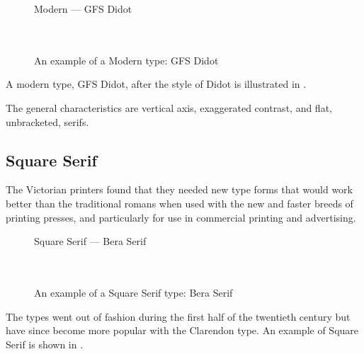 \documentclass[10pt,a4paper,oneside,extrafontsizes]{memoir}%
\begin{document}
\begin{figure}
\centering
{\centering{}\selectfont
  Modern --- GFS Didot \\
  \UCalphabet \\
  \LCalphabet \\
  \fox\par}
\caption{An example of a Modern type: GFS Didot} 
   \label{fig:didot}
\end{figure}


\begin{paracol}{2}
\switchEng
A modern type, GFS Didot,
after the style of 
Didot is illustrated in .

    The general characteristics are vertical axis, exaggerated contrast, 
and flat, unbracketed, serifs.
\end{paracol}

\subsection{Square Serif}

\begin{paracol}{2}
\switchEng
    The Victorian printers found that they needed new type forms that
would work better than the traditional romans when used with the new 
and faster breeds of printing presses, and particularly for use in
commercial printing and advertising. 
\end{paracol}

\begin{figure}
\centering
{\centering{}\selectfont
  Square Serif --- Bera Serif \\
  \UCalphabet \\
  \LCalphabet \\
  \fox\par}
\caption{An example of a Square Serif type: Bera Serif} 
   \label{fig:beraserif}
\end{figure}

\begin{paracol}{2}
\switchEng
    The types went out of fashion during the first half of the twentieth
century but have since become more popular with the 
Clarendon
type. An example of Square Serif
is shown in .
\end{paracol}
\end{document}
